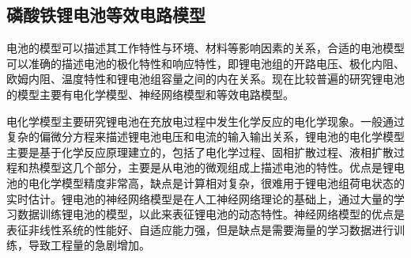 \subsection{磷酸铁锂电池等效电路模型}
电池的模型可以描述其工作特性与环境、材料等影响因素的关系，合适的电池模型可以准确的描述电池的极化特性和响应特性，即锂电池组的开路电压、极化内阻、欧姆内阻、温度特性和锂电池组容量之间的内在关系。现在比较普遍的研究锂电池的模型主要有电化学模型、神经网络模型和等效电路模型。

电化学模型主要研究锂电池在充放电过程中发生化学反应的电化学现象。一般通过复杂的偏微分方程来描述锂电池电压和电流的输入输出关系，锂电池的电化学模型主要是基于化学反应原理建立的，包括了电化学过程、固相扩散过程、液相扩散过程和热模型这几个部分，主要是从电池的微观组成上描述电池的特性。优点是锂电池的电化学模型精度非常高，缺点是计算相对复杂，很难用于锂电池组荷电状态的实时估计。锂电池的神经网络模型是在人工神经网络理论的基础上，通过大量的学习数据训练锂电池的模型，以此来表征锂电池的动态特性。神经网络模型的优点是表征非线性系统的性能好、自适应能力强，但是缺点是需要海量的学习数据进行训练，导致工程量的急剧增加。

